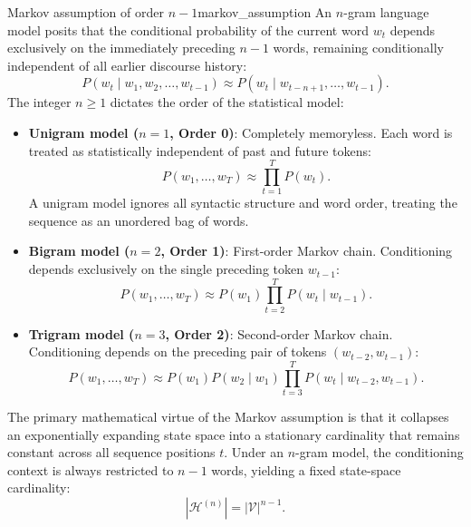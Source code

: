 \documentclass[../../main.tex]{subfiles}
\begin{document}
\begin{definition}{Markov assumption of order $n-1$}{markov_assumption}
An $n$-gram language model posits that the conditional probability of the current word $w_t$ depends exclusively on the immediately preceding $n-1$ words, remaining conditionally independent of all earlier discourse history:
\begin{equation}
P\left(w_t \mid w_1, w_2, \dots, w_{t-1}\right) \approx P\left(w_t \mid w_{t-n+1}, \dots, w_{t-1}\right).
\label{eq:markov_assumption}
\end{equation}
The integer $n \ge 1$ dictates the order of the statistical model:
\begin{itemize}
    \item \textbf{Unigram model ($n=1$, Order 0)}: Completely memoryless. Each word is treated as statistically independent of past and future tokens:
    \begin{equation}
    P\left(w_1, \dots, w_T\right) \approx \prod_{t=1}^T P\left(w_t\right).
    \end{equation}
    A unigram model ignores all syntactic structure and word order, treating the sequence as an unordered bag of words.
    \item \textbf{Bigram model ($n=2$, Order 1)}: First-order Markov chain. Conditioning depends exclusively on the single preceding token $w_{t-1}$:
    \begin{equation}
    P\left(w_1, \dots, w_T\right) \approx P\left(w_1\right) \prod_{t=2}^T P\left(w_t \mid w_{t-1}\right).
    \label{eq:bigram_joint_approximation}
    \end{equation}
    \item \textbf{Trigram model ($n=3$, Order 2)}: Second-order Markov chain. Conditioning depends on the preceding pair of tokens $(w_{t-2}, w_{t-1})$:
    \begin{equation}
    P\left(w_1, \dots, w_T\right) \approx P\left(w_1\right) P\left(w_2 \mid w_1\right) \prod_{t=3}^T P\left(w_t \mid w_{t-2}, w_{t-1}\right).
    \end{equation}
\end{itemize}
\end{definition}

The primary mathematical virtue of the Markov assumption is that it collapses an exponentially expanding state space into a stationary cardinality that remains constant across all sequence positions $t$. Under an $n$-gram model, the conditioning context is always restricted to $n-1$ words, yielding a fixed state-space cardinality:
\begin{equation}
|\mathcal{H}^{(n)}| = |\mathcal{V}|^{n-1}.
\label{eq:state_space_markov}
\end{equation}
\end{document}
